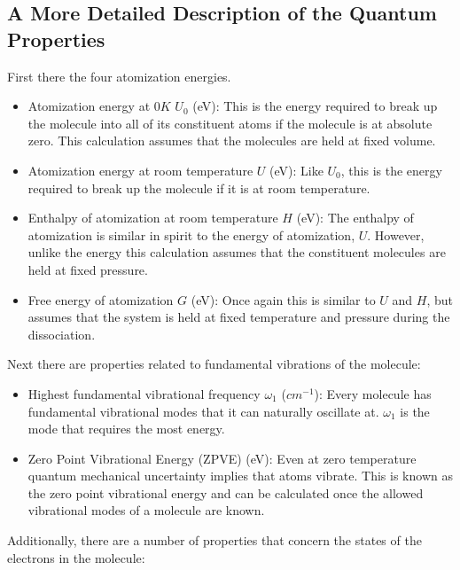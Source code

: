 \documentclass{article}
\begin{document}
\subsection{A More Detailed Description of the Quantum Properties}

First there the four atomization energies. 

\begin{itemize}
    \item Atomization energy at $0K$ $U_0$ (eV): This is the energy required to break up the molecule into all of its constituent atoms if the molecule is at absolute zero. This calculation assumes that the molecules are held at fixed volume.
    \item Atomization energy at room temperature $U$ (eV): Like $U_0$, this is the energy required to break up the molecule if it is at room temperature. %
    \item Enthalpy of atomization at room temperature $H$ (eV): The enthalpy of atomization is similar in spirit to the energy of atomization, $U$. However, unlike the energy this calculation assumes that the constituent molecules are held at fixed pressure.
    \item Free energy of atomization $G$ (eV): Once again this is similar to $U$ and $H$, but assumes that the system is held at fixed temperature and pressure during the dissociation. 
\end{itemize}
Next there are properties related to fundamental vibrations of the molecule:
\begin{itemize}
    \item Highest fundamental vibrational frequency $\omega_1$ ($cm^{-1}$): Every molecule has fundamental vibrational modes that it can naturally oscillate at. $\omega_1$ is the mode that requires the most energy.
    \item Zero Point Vibrational Energy (ZPVE) (eV): Even at zero temperature quantum mechanical uncertainty implies that atoms vibrate. This is known as the zero point vibrational energy and can be calculated once the allowed vibrational modes of a molecule are known.
\end{itemize}
Additionally, there are a number of properties that concern the states of the electrons in the molecule:
\end{document}

